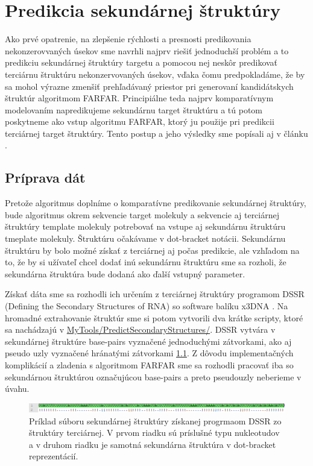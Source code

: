\chapter{Predikcia sekundárnej štruktúry}

Ako prvé opatrenie, na zlepšenie rýchlosti a presnosti predikovania nekonzerovvaných úsekov sme navrhli najprv riešiť jednoduchší problém a to predikciu sekundárnej štruktúry targetu a pomocou nej neskôr predikovať terciárnu štruktúru nekonzervovaných úsekov, vďaka čomu predpokladáme, že by sa mohol výrazne zmenšiť prehľadávaný priestor pri generovaní kandidátskych štruktúr algoritmom FARFAR. Principiálne teda najprv komparatívnym modelovaním napredikujeme sekundárnu target štruktúru a tú potom poskytneme ako vstup algoritmu FARFAR, ktorý ju použije pri predikcii terciárnej target štruktúry. Tento postup a jeho výsledky sme popísali aj v článku \cite{8218009}.

\section{Príprava dát}
Pretože algoritmus doplníme o komparatívne predikovanie sekundárnej štruktúry, bude algoritmus okrem sekvencie target molekuly a sekvencie aj terciárnej štruktúry template molekuly potrebovať na vstupe aj sekundárnu štruktúru tmeplate molekuly. Štruktúru očakávame v dot-bracket notácii. Sekundárnu štruktúru by bolo možné získať z terciárnej aj počas predikcie, ale vzhľadom na to, že by si užívateľ chcel dodať inú sekundárnu štruktúru sme sa rozholi, že sekundárna štruktúra bude dodaná ako ďalší vstupný parameter.


\indent Získať dáta sme sa rozhodli ich určením z terciárnej štruktúry programom DSSR (Defining the Secondary Structures of RNA) so software balíku x3DNA \cite{x3dna}. Na hromadné extrahovanie štruktúr sme si potom vytvorili dva krátke scripty, ktoré sa nachádzajú v \url{MyTools/PredictSecondaryStructures/}. DSSR vytvára v sekundárnej štruktúre base-pairs vyznačené jednoduchými zátvorkami, ako aj pseudo uzly vyznačené hránatými zátvorkami \ref{obr5.0}. Z dôvodu implementačných komplikácií a zladenia s algoritmom FARFAR sme sa rozhodli pracovať iba so sekundárnou štruktúrou označujúcou base-pairs a  preto pseudouzly neberieme v úvahu.
\begin{figure}%
\includegraphics[width=\textwidth]{../img/dssr}
\caption{Príklad súboru sekundárnej štruktúry získanej progrmaom DSSR zo štruktúry terciárnej. V prvom riadku sú príslušné typu nukleotudov a v druhom riadku je samotná sekundárna štruktúra v  dot-bracket reprezentácií.}
\label{obr5.0}
\end{figure}


